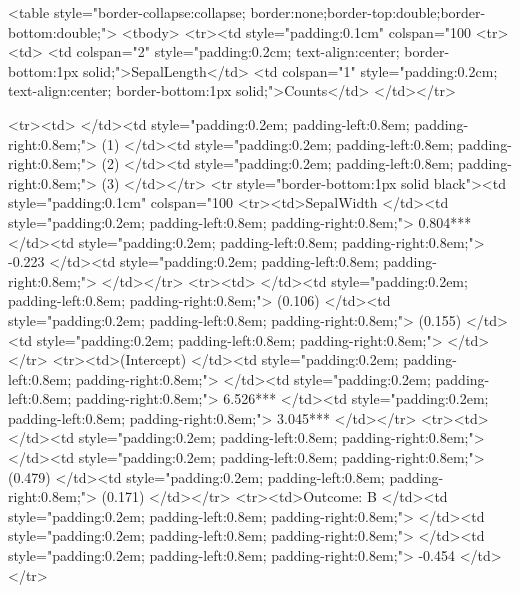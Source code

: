 <table style="border-collapse:collapse; border:none;border-top:double;border-bottom:double;">
<tbody>
<tr><td style="padding:0.1cm" colspan="100%
<tr><td>                     <td colspan="2" style="padding:0.2cm; text-align:center; border-bottom:1px solid;">SepalLength</td> <td colspan="1" style="padding:0.2cm; text-align:center; border-bottom:1px solid;">Counts</td> </td></tr>

<tr><td>                     </td><td style="padding:0.2em; padding-left:0.8em; padding-right:0.8em;">      (1) </td><td style="padding:0.2em; padding-left:0.8em; padding-right:0.8em;">              (2) </td><td style="padding:0.2em; padding-left:0.8em; padding-right:0.8em;">                                                                                            (3) </td></tr>
<tr style="border-bottom:1px solid black"><td style="padding:0.1cm" colspan="100%
<tr><td>SepalWidth           </td><td style="padding:0.2em; padding-left:0.8em; padding-right:0.8em;"> 0.804*** </td><td style="padding:0.2em; padding-left:0.8em; padding-right:0.8em;">           -0.223 </td><td style="padding:0.2em; padding-left:0.8em; padding-right:0.8em;">                                                                                                </td></tr>
<tr><td>                     </td><td style="padding:0.2em; padding-left:0.8em; padding-right:0.8em;">  (0.106) </td><td style="padding:0.2em; padding-left:0.8em; padding-right:0.8em;">          (0.155) </td><td style="padding:0.2em; padding-left:0.8em; padding-right:0.8em;">                                                                                                </td></tr>
<tr><td>(Intercept)          </td><td style="padding:0.2em; padding-left:0.8em; padding-right:0.8em;">          </td><td style="padding:0.2em; padding-left:0.8em; padding-right:0.8em;">         6.526*** </td><td style="padding:0.2em; padding-left:0.8em; padding-right:0.8em;">                                                                                       3.045*** </td></tr>
<tr><td>                     </td><td style="padding:0.2em; padding-left:0.8em; padding-right:0.8em;">          </td><td style="padding:0.2em; padding-left:0.8em; padding-right:0.8em;">          (0.479) </td><td style="padding:0.2em; padding-left:0.8em; padding-right:0.8em;">                                                                                        (0.171) </td></tr>
<tr><td>Outcome: B           </td><td style="padding:0.2em; padding-left:0.8em; padding-right:0.8em;">          </td><td style="padding:0.2em; padding-left:0.8em; padding-right:0.8em;">                  </td><td style="padding:0.2em; padding-left:0.8em; padding-right:0.8em;">                                                                                         -0.454 </td></tr>
